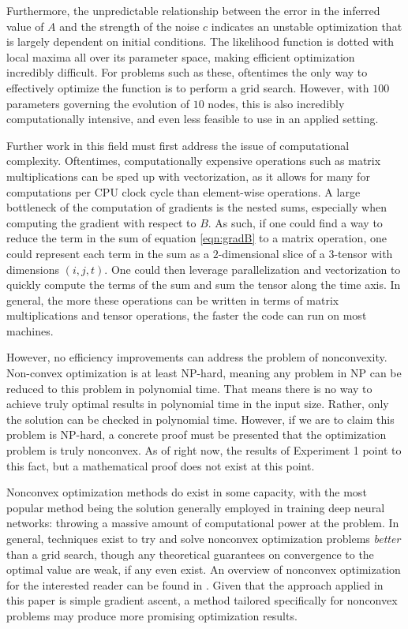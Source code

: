 \documentclass{article}
\theoremstyle{definition}
\begin{document}
Furthermore, the unpredictable relationship between the error in the inferred value of $A$ and the strength of the noise $c$ indicates an unstable optimization that is largely dependent on initial conditions. The likelihood function is dotted with local maxima all over its parameter space, making efficient optimization incredibly difficult. For problems such as these, oftentimes the only way to effectively optimize the function is to perform a grid search. However, with $100$ parameters governing the evolution of $10$ nodes, this is also incredibly computationally intensive, and even less feasible to use in an applied setting.

Further work in this field must first address the issue of computational complexity. Oftentimes, computationally expensive operations such as matrix multiplications can be sped up with vectorization, as it allows for many for computations per CPU clock cycle than element-wise operations. A large bottleneck of the computation of gradients is the nested sums, especially when computing the gradient with respect to $B$. As such, if one could find a way to reduce the term in the sum of equation \ref{eqn:gradB} to a matrix operation, one could represent each term in the sum as a $2$-dimensional slice of a $3$-tensor with dimensions $(i, j, t)$. One could then leverage parallelization and vectorization to quickly compute the terms of the sum and sum the tensor along the time axis. In general, the more these operations can be written in terms of matrix multiplications and tensor operations, the faster the code can run on most machines.

However, no efficiency improvements can address the problem of nonconvexity. Non-convex optimization is at least NP-hard, meaning any problem in NP can be reduced to this problem in polynomial time. That means there is no way to achieve truly optimal results in polynomial time in the input size. Rather, only the solution can be checked in polynomial time. However, if we are to claim this problem is NP-hard, a concrete proof must be presented that the optimization problem is truly nonconvex. As of right now, the results of Experiment 1 point to this fact, but a mathematical proof does not exist at this point.

Nonconvex optimization methods do exist in some capacity, with the most popular method being the solution generally employed in training deep neural networks: throwing a massive amount of computational power at the problem. In general, techniques exist to try and solve nonconvex optimization problems \textit{better} than a grid search, though any theoretical guarantees on convergence to the optimal value are weak, if any even exist. An overview of nonconvex optimization for the interested reader can be found in \cite{JainNonConvexOptimization}. Given that the approach applied in this paper is simple gradient ascent, a method tailored specifically for nonconvex problems may produce more promising optimization results. 
\end{document}
